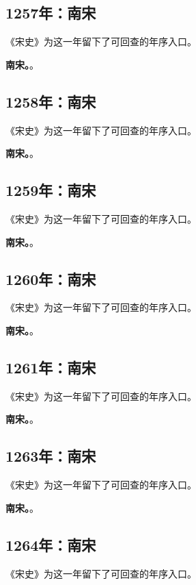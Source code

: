 \subsection{1257年：南宋}
《宋史》为这一年留下了可回查的年序入口。

\noindent\textbf{南宋。}。

\subsection{1258年：南宋}
《宋史》为这一年留下了可回查的年序入口。

\noindent\textbf{南宋。}。

\subsection{1259年：南宋}
《宋史》为这一年留下了可回查的年序入口。

\noindent\textbf{南宋。}。

\subsection{1260年：南宋}
《宋史》为这一年留下了可回查的年序入口。

\noindent\textbf{南宋。}。

\subsection{1261年：南宋}
《宋史》为这一年留下了可回查的年序入口。

\noindent\textbf{南宋。}。

\subsection{1263年：南宋}
《宋史》为这一年留下了可回查的年序入口。

\noindent\textbf{南宋。}。

\subsection{1264年：南宋}
《宋史》为这一年留下了可回查的年序入口。


